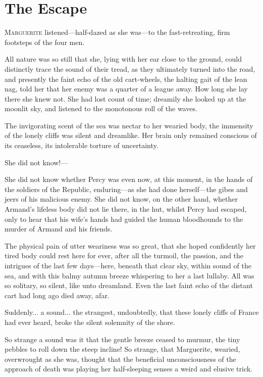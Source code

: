 
\chapter{The Escape}
\lettrine[lines=4]{M}{arguerite} listened---half-dazed as she was---to the fast-retreating, firm footsteps of the four men.

All nature was so still that she, lying with her ear close to the ground, could distinctly trace the sound of their tread, as they ultimately turned into the road, and presently the faint echo of the old cart-wheels, the halting gait of the lean nag, told her that her enemy was a quarter of a league away. How long she lay there she knew not. She had lost count of time; dreamily she looked up at the moonlit sky, and listened to the monotonous roll of the waves.

The invigorating scent of the sea was nectar to her wearied body, the immensity of the lonely cliffs was silent and dreamlike. Her brain only remained conscious of its ceaseless, its intolerable torture of uncertainty.

She did not know!---

She did not know whether Percy was even now, at this moment, in the hands of the soldiers of the Republic, enduring---as she had done herself---the gibes and jeers of his malicious enemy. She did not know, on the other hand, whether Armand's lifeless body did not lie there, in the hut, whilst Percy had escaped, only to hear that his wife's hands had guided the human bloodhounds to the murder of Armand and his friends.

The physical pain of utter weariness was so great, that she hoped confidently her tired body could rest here for ever, after all the turmoil, the passion, and the intrigues of the last few days---here, beneath that clear sky, within sound of the sea, and with this balmy autumn breeze whispering to her a last lullaby. All was so solitary, so silent, like unto dreamland. Even the last faint echo of the distant cart had long ago died away, afar.

Suddenly... a sound... the strangest, undoubtedly, that these lonely cliffs of France had ever heard, broke the silent solemnity of the shore.

So strange a sound was it that the gentle breeze ceased to murmur, the tiny pebbles to roll down the steep incline! So strange, that Marguerite, wearied, overwrought as she was, thought that the beneficial unconsciousness of the approach of death was playing her half-sleeping senses a weird and elusive trick.

